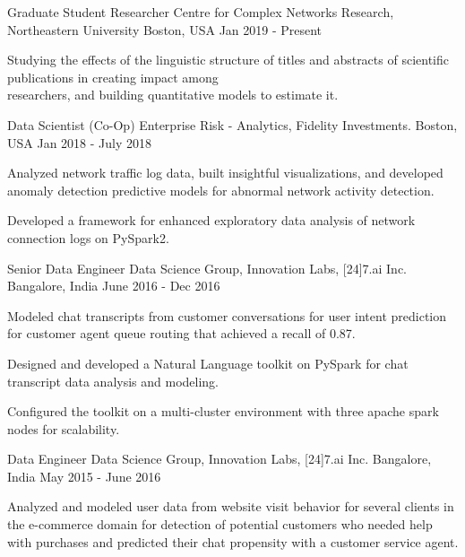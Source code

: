 \begin{cventries}
  \cventry
    {Graduate Student Researcher}
    {Centre for Complex Networks Research, Northeastern University}
    {Boston, USA}
    {Jan 2019 - Present}
    {
      \begin{cvitems}
        \item {Studying the effects of the linguistic structure of titles and abstracts of scientific publications in creating impact among \\ researchers, and building quantitative models to estimate it.}
        \end{cvitems}
    }
  \cventry
    {Data Scientist (Co-Op)}
    {Enterprise Risk - Analytics, Fidelity Investments.}
    {Boston, USA}
    {Jan 2018 - July 2018}
    {
      \begin{cvitems}
        \item {Analyzed network traffic log data, built insightful visualizations, and developed anomaly detection predictive models for abnormal network activity detection.}
        \item {Developed a framework for enhanced exploratory data analysis of network connection logs on PySpark2.}
      \end{cvitems}
    }
  \cventry
    {Senior Data Engineer}
    {Data Science Group, Innovation Labs, [24]7.ai Inc.}
    {Bangalore, India}
    {June 2016 - Dec 2016}
    {
      \begin{cvitems}
        \item {Modeled chat transcripts from customer conversations for user intent prediction for customer agent queue routing that achieved a recall of 0.87.}
        \item {Designed and developed a Natural Language toolkit on PySpark for chat transcript data analysis and modeling.}
        \item {Configured the toolkit on a multi-cluster environment with three apache spark nodes for scalability.}
      \end{cvitems}
    }
  \cventry
    {Data Engineer}
    {Data Science Group, Innovation Labs, [24]7.ai Inc.}  
    {Bangalore, India}
    {May 2015 - June 2016}
    {
      \begin{cvitems}
        \item {Analyzed and modeled user data from website visit behavior for several clients in the e-commerce domain for detection of potential customers who needed help with purchases and predicted their chat propensity with a customer service agent.}

\end{cvitems}}
\end{cventries}
